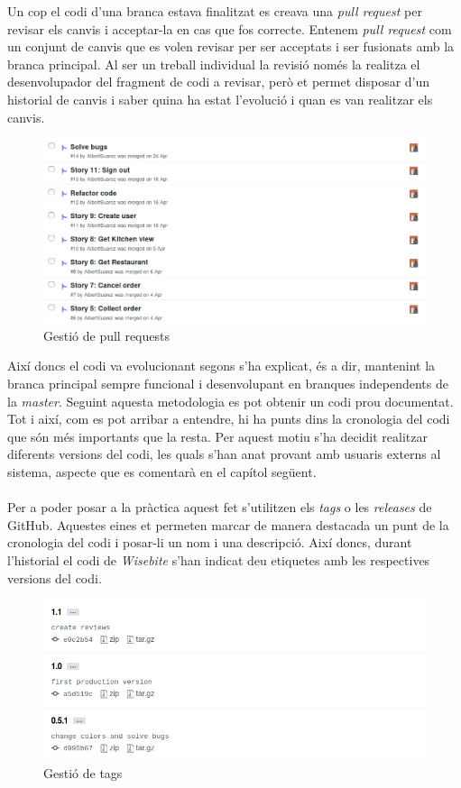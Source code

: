 \noindent Un cop el codi d'una branca estava finalitzat es creava una \textit{pull request} per revisar els canvis i acceptar-la en cas que fos correcte. Entenem \textit{pull request} com un conjunt de canvis que es volen revisar per ser acceptats i ser fusionats amb la branca principal. Al ser un treball individual la revisió només la realitza el desenvolupador del fragment de codi a revisar, però et permet disposar d'un historial de canvis i saber quina ha estat l'evolució i quan es van realitzar els canvis.
\\
\begin{figure}[H]
\includegraphics[scale=0.4]{Figures/pullrequests.png}
\caption{Gestió de pull requests}
\end{figure}

\noindent Així doncs el codi va evolucionant segons s'ha explicat, és a dir, mantenint la branca principal sempre funcional i desenvolupant en branques independents de la \textit{master}. Seguint aquesta metodologia es pot obtenir un codi prou documentat. Tot i així, com es pot arribar a entendre, hi ha punts dins la cronologia del codi que són més importants que la resta. Per aquest motiu s'ha decidit realitzar diferents versions del codi, les quals s'han anat provant amb usuaris externs al sistema, aspecte que es comentarà en el capítol següent.
\\\\
Per a poder posar a la pràctica aquest fet s'utilitzen els \textit{tags} o les \textit{releases} de GitHub. Aquestes eines et permeten marcar de manera destacada un punt de la cronologia del codi i posar-li un nom i una descripció. Així doncs, durant l'historial el codi de \textit{Wisebite} s'han indicat deu etiquetes amb les respectives versions del codi.
\\
\begin{figure}[H]
\includegraphics[scale=0.55]{Figures/tags.png}
\caption{Gestió de tags}
\end{figure}

